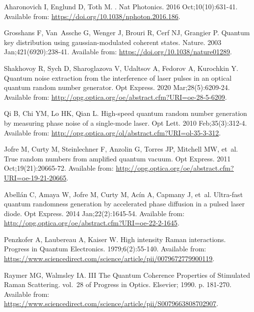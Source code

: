 \documentclass[]{interact}
\theoremstyle{plain}%
\theoremstyle{definition}
\theoremstyle{remark}
\begin{document}
\begin{thebibliography}{100}
Aharonovich I, Englund D, Toth M.
.
\newblock Nat Photonics. 2016 Oct;10(10):631-41.
\newblock Available from: \url{https://doi.org/10.1038/nphoton.2016.186}.

Grosshans F, Van~Assche G, Wenger J, Brouri R, Cerf NJ, Grangier P.
\newblock Quantum key distribution using gaussian-modulated coherent states.
\newblock Nature. 2003 Jan;421(6920):238-41.
\newblock Available from: \url{https://doi.org/10.1038/nature01289}.

Shakhovoy R, Sych D, Sharoglazova V, Udaltsov A, Fedorov A, Kurochkin Y.
\newblock Quantum noise extraction from the interference of laser pulses in an
  optical quantum random number generator.
\newblock Opt Express. 2020 Mar;28(5):6209-24.
\newblock Available from:
  \url{http://opg.optica.org/oe/abstract.cfm?URI=oe-28-5-6209}.

Qi B, Chi YM, Lo HK, Qian L.
\newblock High-speed quantum random number generation by measuring phase noise
  of a single-mode laser.
\newblock Opt Lett. 2010 Feb;35(3):312-4.
\newblock Available from:
  \url{http://opg.optica.org/ol/abstract.cfm?URI=ol-35-3-312}.

Jofre M, Curty M, Steinlechner F, Anzolin G, Torres JP, Mitchell MW, et~al.
\newblock True random numbers from amplified quantum vacuum.
\newblock Opt Express. 2011 Oct;19(21):20665-72.
\newblock Available from:
  \url{http://opg.optica.org/oe/abstract.cfm?URI=oe-19-21-20665}.

Abell\'{a}n C, Amaya W, Jofre M, Curty M, Ac\'{i}n A, Capmany J, et~al.
\newblock Ultra-fast quantum randomness generation by accelerated phase
  diffusion in a pulsed laser diode.
\newblock Opt Express. 2014 Jan;22(2):1645-54.
\newblock Available from:
  \url{http://opg.optica.org/oe/abstract.cfm?URI=oe-22-2-1645}.

Penzkofer A, Laubereau A, Kaiser W.
\newblock High intensity Raman interactions.
\newblock Progress in Quantum Electronics. 1979;6(2):55-140.
\newblock Available from:
  \url{https://www.sciencedirect.com/science/article/pii/0079672779900119}.

Raymer MG, Walmsley IA.
\newblock III The Quantum Coherence Properties of Stimulated Raman Scattering.
\newblock vol.~28 of Progress in Optics. Elsevier; 1990. p. 181-270.
\newblock Available from:
  \url{https://www.sciencedirect.com/science/article/pii/S0079663808702907}.


\end{thebibliography}
\end{document}
